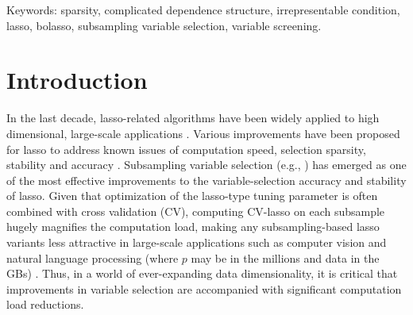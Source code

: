 \documentclass[12pt]{article}
\begin{document}
\noindent
\normalsize
Keywords: sparsity, complicated dependence structure, irrepresentable condition, lasso, bolasso, subsampling variable selection, variable screening.

\vfill
\newpage
{}


\clearpage
{}

\section{Introduction}

In the last decade, lasso-related algorithms have been widely applied to high dimensional, large-scale applications \citep{efronall04, friedman2007pathwise, friedman2010regularization}. Various improvements have been proposed for lasso to address known issues of computation speed, selection sparsity, stability and accuracy \citep{weisberg04, lim2016estimation}. Subsampling variable selection (e.g., \citet{bach2008bolasso, meinshausen2010stability, guo2015improved}) has emerged as one of the most effective improvements to the variable-selection accuracy and stability of lasso. Given that optimization of the lasso-type tuning parameter is often combined with cross validation (CV), computing CV-lasso on each subsample hugely magnifies the computation load, making any subsampling-based lasso variants less attractive in large-scale applications such as computer vision and natural language processing (where $p$ may be in the millions and data in the GBs) \citep{xu2012asymptotic}. Thus, in a world of ever-expanding data dimensionality, it is critical that improvements in variable selection are accompanied with significant computation load reductions.
\end{document}
